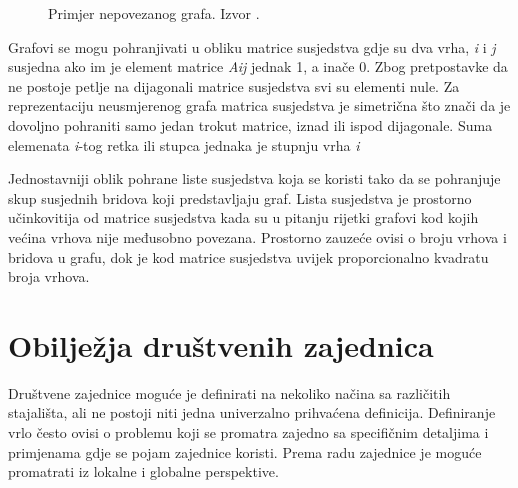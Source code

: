 \documentclass[times, utf8, diplomski]{fer}
\begin{document}
\begin{figure}
	\caption{Primjer nepovezanog grafa. Izvor \cite{nakic_pavcevic_2019}.}
	\label{fig:graph}
\end{figure}

Grafovi se mogu pohranjivati u obliku matrice susjedstva gdje su dva vrha, \textit{i} i \textit{j} susjedna ako im je element matrice \textit{A{ij}} jednak 1, a inače 0. Zbog pretpostavke da ne postoje petlje na dijagonali matrice susjedstva svi su elementi nule. Za reprezentaciju neusmjerenog grafa matrica susjedstva je simetrična što znači da je dovoljno pohraniti samo jedan trokut matrice, iznad ili ispod dijagonale. Suma elemenata \textit{i}-tog retka ili stupca jednaka je stupnju vrha \textit{i}

Jednostavniji oblik pohrane liste susjedstva koja se koristi tako da se pohranjuje skup susjednih bridova koji predstavljaju graf. Lista susjedstva je prostorno učinkovitija od matrice susjedstva kada su u pitanju rijetki grafovi kod kojih većina vrhova nije međusobno povezana. Prostorno zauzeće ovisi o broju vrhova i bridova u grafu, dok je kod matrice susjedstva uvijek proporcionalno kvadratu broja vrhova.


\section{Obilježja društvenih zajednica} 

Društvene zajednice moguće je definirati na nekoliko načina sa različitih stajališta, ali ne postoji niti jedna univerzalno prihvaćena definicija. Definiranje vrlo često ovisi o problemu koji se promatra zajedno sa specifičnim detaljima i primjenama gdje se pojam zajednice koristi. Prema radu \cite{fortunato2010community} zajednice je moguće promatrati iz lokalne i globalne perspektive.
\end{document}
